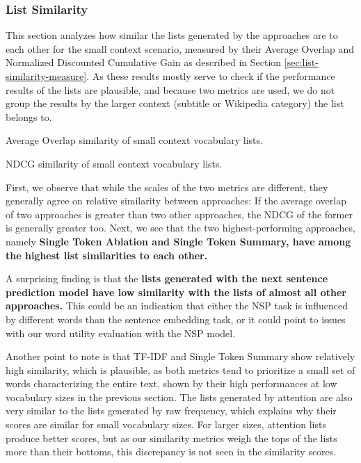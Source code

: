 \subsubsection{List Similarity}
This section analyzes how similar the lists generated by the approaches are to each other for the small context scenario, measured by their Average Overlap and Normalized Discounted Cumulative Gain as described in Section \ref{sec:list-similarity-measure}.
As these results mostly serve to check if the performance results of the lists are plausible, and because two metrics are used, we do not group the results by the larger context (subtitle or Wikipedia category) the list belongs to.

\begin{table}[H]
	\centering
	\resizebox{\textwidth}{!}{%
		
	}
	\caption{Average Overlap similarity of small context vocabulary lists.}
	\label{tbl:similarity-results-single-average-overlap}
\end{table}

\begin{table}[H]
	\centering
	\resizebox{\textwidth}{!}{%
		
	}
	\caption{NDCG similarity of small context vocabulary lists.}
	\label{tbl:similarity-results-single-ndcg}
\end{table}

First, we observe that while the scales of the two metrics are different, they generally agree on relative similarity between approaches:
If the average overlap of two approaches is greater than two other approaches, the NDCG of the former is generally greater too.
Next, we see that the two highest-performing approaches, namely \textbf{Single Token Ablation and Single Token Summary, have among the highest list similarities to each other.}

A surprising finding is that the \textbf{lists generated with the next sentence prediction model have low similarity with the lists of almost all other approaches.}
This could be an indication that either the NSP task is influenced by different words than the sentence embedding task, or it could point to issues with our word utility evaluation with the NSP model.

Another point to note is that TF-IDF and Single Token Summary show relatively high similarity, which is plausible, as both metrics tend to prioritize a small set of words characterizing the entire text, shown by their high performances at low vocabulary sizes in the previous section.
The lists generated by attention are also very similar to the lists generated by raw frequency, which explains why their scores are similar for small vocabulary sizes.
For larger sizes, attention lists produce better scores, but as our similarity metrics weigh the tops of the lists more than their bottoms, this discrepancy is not seen in the similarity scores.

